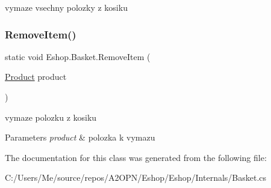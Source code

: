 vymaze vsechny polozky z kosiku 

\mbox{\label{class_eshop_1_1_basket_aed39381bc57925fbb68a5dd7c27cb177}} 
\subsubsection{\texorpdfstring{RemoveItem()}{RemoveItem()}}
{\footnotesize\ttfamily static void Eshop.\+Basket.\+Remove\+Item (\begin{DoxyParamCaption}\item[{\mbox{\hyperlink{class_eshop_1_1_product}{Product}}}]{product }\end{DoxyParamCaption})\hspace{0.3cm}{\ttfamily [static]}}



vymaze polozku z kosiku 


\begin{DoxyParams}{Parameters}
{\em product} & polozka k vymazu\\
\hline
\end{DoxyParams}


The documentation for this class was generated from the following file\+:\begin{DoxyCompactItemize}
\item 
C\+:/\+Users/\+Me/source/repos/\+A2\+O\+P\+N/\+Eshop/\+Eshop/\+Internals/Basket.\+cs\end{DoxyCompactItemize}
